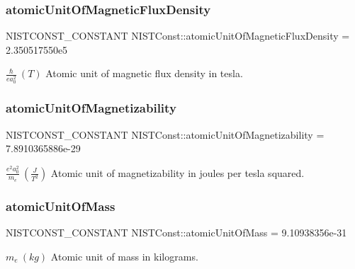\subsubsection{\texorpdfstring{atomic\+Unit\+Of\+Magnetic\+Flux\+Density}{atomicUnitOfMagneticFluxDensity}}
{\footnotesize\ttfamily N\+I\+S\+T\+C\+O\+N\+S\+T\+\_\+\+C\+O\+N\+S\+T\+A\+NT N\+I\+S\+T\+Const\+::atomic\+Unit\+Of\+Magnetic\+Flux\+Density = 2.\+350517550e5}

$\frac{\hbar}{e a_0^2} \ (T)$ Atomic unit of magnetic flux density in tesla. \mbox{\label{group___n_i_s_t_const-_atomic_unit_ga20e7e2a56b476e5730ce9c59a4efc946}} 
\subsubsection{\texorpdfstring{atomic\+Unit\+Of\+Magnetizability}{atomicUnitOfMagnetizability}}
{\footnotesize\ttfamily N\+I\+S\+T\+C\+O\+N\+S\+T\+\_\+\+C\+O\+N\+S\+T\+A\+NT N\+I\+S\+T\+Const\+::atomic\+Unit\+Of\+Magnetizability = 7.\+8910365886e-\/29}

$\frac{e^2a_0^2}{m_e} \ (\frac{J}{T^2})$ Atomic unit of magnetizability in joules per tesla squared. \mbox{\label{group___n_i_s_t_const-_atomic_unit_gaffbb7b29a9d92b540321f074f46903ae}} 
\subsubsection{\texorpdfstring{atomic\+Unit\+Of\+Mass}{atomicUnitOfMass}}
{\footnotesize\ttfamily N\+I\+S\+T\+C\+O\+N\+S\+T\+\_\+\+C\+O\+N\+S\+T\+A\+NT N\+I\+S\+T\+Const\+::atomic\+Unit\+Of\+Mass = 9.\+10938356e-\/31}

$m_e \ (kg)$ Atomic unit of mass in kilograms. \mbox{\label{group___n_i_s_t_const-_atomic_unit_ga3a2d8ad829da0868381d6f31817ed453}} 
